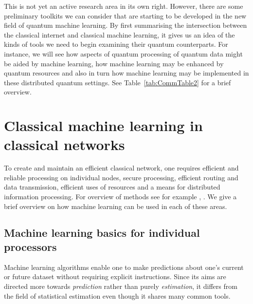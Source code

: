 \documentclass[twocolumn, aps, rmp, amsmath, amssymb, nofootinbib, superscriptaddress, longbibliography, floatfix, table-of-contents, eqsecnum]{revtex4-2}
\begin{document}
This is not yet an active research area in its own right. However, there are some preliminary toolkits we can consider that are starting to be developed in the new field of quantum machine learning. By first summarising the intersection between the classical internet and classical machine learning, it gives us an idea of the kinds of tools we need to begin examining their quantum counterparts. For instance, we will see how aspects of quantum processing of quantum data might be aided by machine learning, how machine learning may be enhanced by quantum resources and also in turn how machine learning may be implemented in these distributed quantum settings. See Table~\eqref{tab:CommTable2} for a brief overview. 

\section{Classical machine learning in classical networks}
 To create and maintain an efficient classical network, one requires efficient and reliable processing on individual nodes, secure processing, efficient routing and data transmission, efficient uses of resources and a means for distributed information processing. For overview of methods see for example \cite{boutaba2018comprehensive}, \cite{wang2018machine}.  We give a brief overview on how machine learning can be used in each of these areas. 

\subsection{Machine learning basics for individual processors}
Machine learning algorithms enable one to make predictions about one's current or future dataset without requiring explicit instructions. Since its aims are directed more towards \textit{prediction} rather than purely \textit{estimation}, it differs from the field of statistical estimation even though it shares many common tools.
\end{document}
